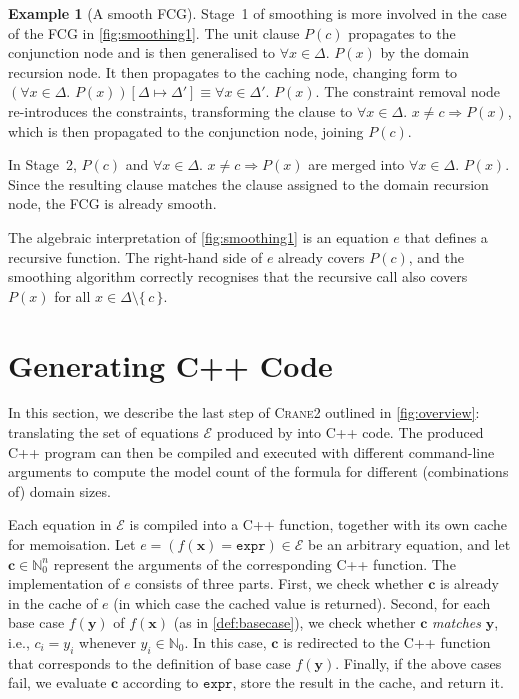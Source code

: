 \documentclass{article}
\theoremstyle{definition}
\newtheorem{example}{Example}
\theoremstyle{remark}
\newcommand{\expr}{\mathtt{expr}}
\newcommand{\Cranetwo}{\textsc{Crane2}}
\begin{document}
\begin{example}[A smooth FCG]\label{example:smooth}
  Stage~1 of smoothing is more involved in the case of the FCG in
  \cref{fig:smoothing1}. The unit clause $P(c)$ propagates to the conjunction
  node and is then generalised to $\forall x \in \Delta\text{. }P(x)$ by the
  domain recursion node. It then propagates to the caching node, changing form
  to $(\forall x \in \Delta\text{.
  }P(x))[\Delta \mapsto \Delta'] \equiv \forall x \in \Delta'\text{. }P(x)$. The
  constraint removal node re-introduces the constraints, transforming the clause
  to $\forall x \in \Delta\text{. }x \ne c \Rightarrow P(x)$, which is then
  propagated to the conjunction node, joining $P(c)$.

  In Stage~2, $P(c)$ and $\forall x \in \Delta\text{. }x \ne c \Rightarrow P(x)$
  are merged into $\forall x \in \Delta\text{. }P(x)$. Since the resulting
  clause matches the clause assigned to the domain recursion node, the FCG is
  already smooth.
\end{example}

The algebraic interpretation of \cref{fig:smoothing1} is an equation $e$ that
defines a recursive function. The right-hand side of $e$ already covers $P(c)$,
and the smoothing algorithm correctly recognises that the recursive call also
covers $P(x)$ for all $x \in \Delta \setminus \{\, c \,\}$.

\section{Generating C++ Code}\label{sec:cpp}

In this section, we describe the last step of \Cranetwo{} outlined in
\cref{fig:overview}: translating the set of equations $\mathcal{E}$ produced by
\CompileWithBaseCases into C++ code. The produced C++ program can then be
compiled and executed with different command-line arguments to compute the model
count of the formula for different (combinations of) domain sizes.

Each equation in $\mathcal{E}$ is compiled into a C++ function, together with
its own cache for memoisation. Let
$e = (f(\mathbf{x}) = \expr{}) \in \mathcal{E}$ be an arbitrary equation, and
let $\mathbf{c} \in \mathbb{N}_{0}^{n}$ represent the arguments of the
corresponding C++ function. The implementation of $e$ consists of three parts.
First, we check whether $\mathbf{c}$ is already in the cache of $e$ (in which
case the cached value is returned). Second, for each base case $f(\mathbf{y})$
of $f(\mathbf{x})$ (as in \cref{def:basecase}), we check whether $\mathbf{c}$
\emph{matches} $\mathbf{y}$, i.e., $c_{i} = y_{i}$ whenever
$y_{i} \in \mathbb{N}_{0}$. In this case, $\mathbf{c}$ is redirected to the C++
function that corresponds to the definition of base case $f(\mathbf{y})$.
Finally, if the above cases fail, we evaluate $\mathbf{c}$ according to
$\expr{}$, store the result in the cache, and return it.
\end{document}
